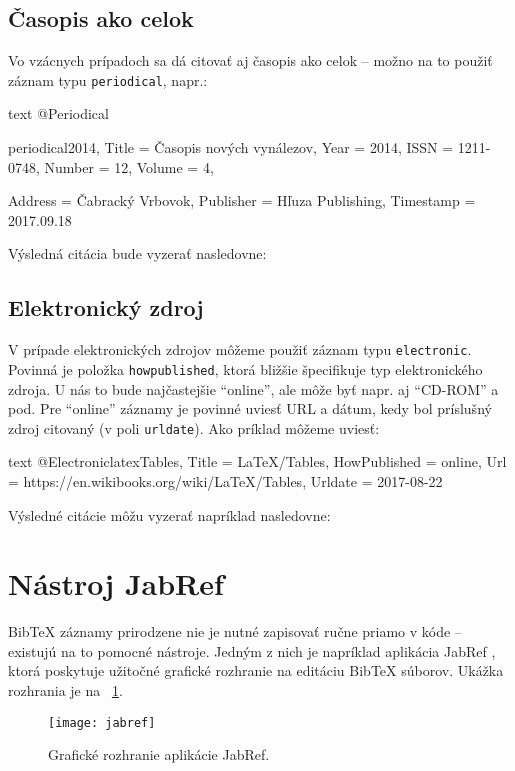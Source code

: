 \noindent[X] 

\subsection{Časopis ako celok}

Vo vzácnych prípadoch sa dá citovať aj časopis ako celok -- možno na to použiť záznam typu \texttt{periodical}, napr.:
\begin{inlinecode}[breaklines]{text}
@Periodical{periodical2014,
  Title                    = {Časopis nových vynálezov},
  Year                     = {2014},
  ISSN                     = {1211-0748},
  Number                   = {12},
  Volume                   = {4},

  Address                  = {Čabracký Vrbovok},
  Publisher                = {Hľuza Publishing},
  Timestamp                = {2017.09.18}
}
\end{inlinecode}
Výsledná citácia bude vyzerať nasledovne:

\noindent[X] 

\subsection{Elektronický zdroj}

V prípade elektronických zdrojov môžeme použiť záznam typu \texttt{electronic}. Povinná je položka \texttt{howpublished}, ktorá bližšie špecifikuje typ elektronického zdroja. U nás to bude najčastejšie \enquote{online}, ale môže byť napr. aj \enquote{CD-ROM} a pod. Pre \enquote{online} záznamy je povinné uviesť URL a dátum, kedy bol príslušný zdroj citovaný (v poli \texttt{urldate}). Ako príklad môžeme uviesť:
\begin{inlinecode}[breaklines]{text}
@Electronic{latexTables,
  Title                    = {LaTeX/Tables},
  HowPublished             = {online},
  Url                      = {https://en.wikibooks.org/wiki/LaTeX/Tables},
  Urldate                  = {2017-08-22}
}
\end{inlinecode}

Výsledné citácie môžu vyzerať napríklad nasledovne:

\noindent[X] 

\noindent[X] 

\section{Nástroj JabRef}

BibTeX záznamy prirodzene nie je nutné zapisovať ručne priamo v kóde -- existujú na to pomocné nástroje. Jedným z nich je napríklad aplikácia JabRef \cite{jabref}, ktorá poskytuje užitočné grafické rozhranie na editáciu BibTeX súborov. Ukážka rozhrania je na \figurename~\ref{fig:jabref}.

\begin{figure}
\centering
\texttt{[image: jabref]}
\caption{Grafické rozhranie aplikácie JabRef.}
\label{fig:jabref}
\end{figure}
